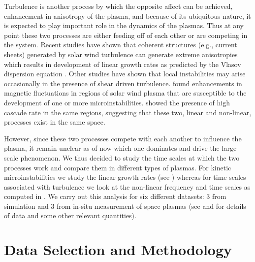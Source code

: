         Turbulence is another process by which the opposite affect can be achieved, enhancement in
        anisotropy of the plasma, and because of its ubiquitous nature, it is expected to play
        important role in the dynamics of the plasmas. Thus at any point these two processes are
        either feeding off of each other or are competing in the system. Recent studies have shown
        that coherent structures (e.g., current sheets) generated by solar wind turbulence can
        generate extreme anisotropies \citep{Greco2012,Servidio2015,Karimabadi2013} which results in
        development of linear growth rates as predicted by the Vlasov dispersion equation
        \citep{Qudsi2020a}. Other studies \citep{Karimabadi2013,Matthaeus2015} have shown that local
        instabilities may arise occasionally in the presence of shear driven turbulence.
        \citet{Bale2009} found enhancements in magnetic fluctuations in regions of solar wind plasma
        that are susceptible to the development of one or more microinstabilities. \citet{Osman2013}
        showed the presence of high cascade rate in the same regions, suggesting that these two,
        linear and non-linear, processes exist in the same space.

        However, since these two processes compete with each another to influence the plasma, it
        remain unclear as of now which one dominates and drive the large scale phenomenon. We thus
        decided to study the time scales at which the two processes work and compare them in
        different types of plasmas. For kinetic microinstabilities we study the linear growth rates
        (see ) whereas for time scales associated with turbulence we look at the
        non-linear frequency and time scales as computed in . We carry out this
        analysis for six different datasets: 3 from simulation and 3 from in-situ measurement of
        space plasmas (see  and  for details of data and some
        other relevant quantities).

    \section{Data Selection and Methodology} \label{sec:data7}

